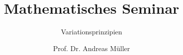 %
%
%


\beamertemplatenavigationsymbolsempty
\title[MathSem]{Mathematisches Seminar}
\subtitle[]{Variationsprinzipien}
\author[A.~Müller]{Prof. Dr. Andreas Müller}
\date[]{}

